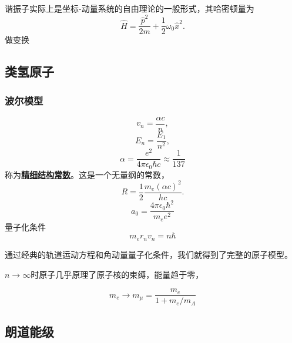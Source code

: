 \documentclass[UTF8, a4paper]{ctexart}
\newcommand{\concept}[1]{\underline{\textbf{#1}}}
\begin{document}
谐振子实际上是坐标-动量系统的自由理论的一般形式，其哈密顿量为
\begin{equation}
    \hat{H} = \frac{\hat{p}^2}{2m} + \frac{1}{2} \omega_0 \hat{x}^2.
\end{equation}
做变换


\subsection{类氢原子}

\subsubsection{波尔模型}

\[
    v_n = \frac{\alpha c}{n},
\]
\[
    E_n = \frac{E_1}{n^2},
\]
\begin{equation}
    \alpha = \frac{e^2}{4\pi \epsilon_0 \hbar c} \approx \frac{1}{137}
\end{equation}
称为\concept{精细结构常数}。这是一个无量纲的常数，
\[
    R = \frac{1}{2} \frac{m_e (\alpha c)^2}{hc}.
\]
\[
    a_0 = \frac{4\pi\epsilon_0 \hbar^2}{m_e e^2}
\]
量子化条件
\begin{equation}
    m_e r_n v_n = n \hbar
\end{equation}

通过经典的轨道运动方程和角动量量子化条件，我们就得到了完整的原子模型。

$n\to\infty$时原子几乎原理了原子核的束缚，能量趋于零，

\[
    m_e \longrightarrow m_\mu = \frac{m_e}{1 + m_e/m_A}
\]


\subsection{朗道能级}
\end{document}
